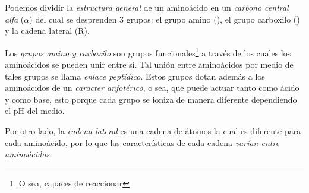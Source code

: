 Podemos dividir la \emph{estructura general} de un aminoácido en un \emph{carbono central alfa} ($\alpha$) del cual se desprenden 3 grupos: el grupo amino (), el grupo carboxilo () y la cadena lateral (R). 

Los \emph{grupos amino y carboxilo} son grupos funcionales\footnote{O sea, capaces de reaccionar} a través de los cuales los aminoácidos se pueden unir entre sí. Tal unión entre aminoácidos por medio de tales grupos se llama \emph{enlace peptídico}. Estos grupos dotan además a los aminoácidos de un \emph{caracter anfotérico}, o sea, que puede actuar tanto como ácido y como base, esto porque cada grupo se ioniza de manera diferente dependiendo el pH del medio. 

Por otro lado, la \emph{cadena lateral} es una cadena de átomos la cual es diferente para cada aminoácido, por lo que las características de cada cadena \emph{varían entre aminoácidos}.


